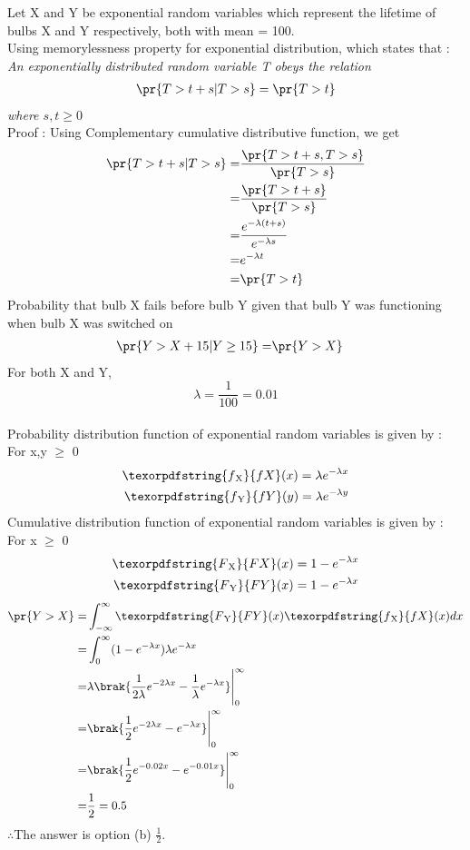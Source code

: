 Let X and Y be exponential random variables which represent the lifetime of bulbs X and Y respectively, both with mean = 100.\\
Using memorylessness property for exponential distribution, which states that :\\
\emph{An exponentially distributed random variable T obeys the relation}
\begin{align}
  \pr{T>t+s |T>s} = \pr{T>t}
\end{align} 
\emph{where $s,t\geq 0$}\\
Proof : Using Complementary cumulative distributive function, we get
\begin{align}
   \pr{T>t+s |T>s} =& \frac{\pr{T>t+s , T>s}}{\pr{T>s}} \\
   =& \frac{\pr{T>t+s}}{\pr{T>s}} \\
   =& \frac{e^{-\lambda(t+s)}}{e^{-\lambda s}}\\
   =&  e^{-\lambda t}\\
   =& \pr{T>t}
\end{align}
Probability that bulb X fails before bulb Y given that bulb Y was functioning when bulb X was switched on 
\begin{align}
  \pr{Y>X+15 | Y \geq 15}
  =& \pr{Y>X}
\end{align}
For both X and Y,
\begin{equation}
\lambda= \frac{1}{100} = 0.01
\end{equation}
\\
Probability distribution function of exponential random variables is given by : 
For x,y $\geq$ 0
\begin{align}
    \texorpdfstring{f\textsubscript{X}}{f X}(x) = \lambda e^{-\lambda x}\\
    \texorpdfstring{f\textsubscript{Y}}{f Y}(y) = \lambda e^{-\lambda y}
\end{align}
Cumulative distribution function of exponential random variables is given by : 
For x $\geq$ 0
\begin{align}
    \texorpdfstring{F\textsubscript{X}}{F X}(x) = 1- e^{-\lambda x}\\
    \texorpdfstring{F\textsubscript{Y}}{F Y}(x) = 1- e^{-\lambda x}
\end{align}
\begin{align}
    \pr{Y>X} =& \int_{-\infty}^{\infty}  \texorpdfstring{F\textsubscript{Y}}{F Y}(x) \texorpdfstring{f\textsubscript{X}}{f X}(x)  dx\\
    =& \int_{0}^{\infty} ( 1- e^{-\lambda x}) \lambda e^{-\lambda x}\\
    =&  \lambda \brak{\frac{1}{2\lambda} e^{-2\lambda x} - \frac{1}{\lambda} e^{-\lambda x}} \Bigg|_0^\infty\\
     =& \brak{\frac{1}{2} e^{-2\lambda x} - e^{-\lambda x}} \Bigg|_0^\infty\\
    =& \brak{\frac{1}{2} e^{-0.02x} - e^{-0.01x}} \Bigg|_0^\infty\\
    =& \frac{1}{2} = 0.5
\end{align}
 $\therefore$The answer is option (b) \large $\frac{1}{2}$.
